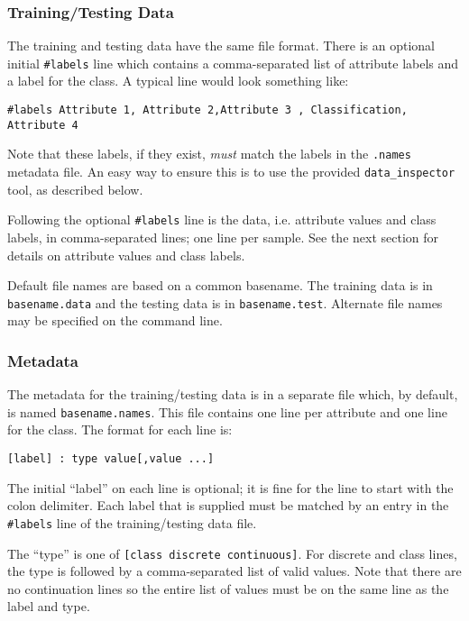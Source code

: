 \documentclass{article}
\begin{document}
\subsubsection{Training/Testing Data}

The training and testing data have the same file format. There is an optional
initial \verb=#labels= line which contains a comma-separated list of attribute labels and a
label for the class. A typical line would look something like:

\begin{verbatim}
#labels Attribute 1, Attribute 2,Attribute 3 , Classification, Attribute 4
\end{verbatim}

Note that these labels, if they exist, \emph{must} match the labels in the \verb=.names= metadata file. 
An easy way to ensure this is to use the provided \verb=data_inspector= tool, as described below. 

Following the optional \verb=#labels= line is the data, i.e. attribute values and class labels,
in comma-separated lines; one line per
sample. See the next section for details on attribute values and class labels.

Default file names are based on a common basename. The training data is in \verb=basename.data=
and the testing data is in \verb=basename.test=. Alternate file names may be specified on the
command line.

\subsubsection{Metadata}

The metadata for the training/testing data is in a separate file which, by default, is
named \verb=basename.names=. This file contains one line per attribute and one line for the class.
The format for each line is:

\begin{verbatim}
[label] : type value[,value ...]
\end{verbatim}

The initial ``label'' on each line is optional; it is fine for the line to start with the colon
delimiter. Each label that is supplied must be matched by an entry in the \verb=#labels= line of the
training/testing data file.

The ``type'' is one of \verb=[class discrete continuous]=.
For discrete and class lines, the type is followed by a comma-separated list of valid values.
Note that there are no continuation lines so the entire list of values must be on the same
line as the label and type.
\end{document}
